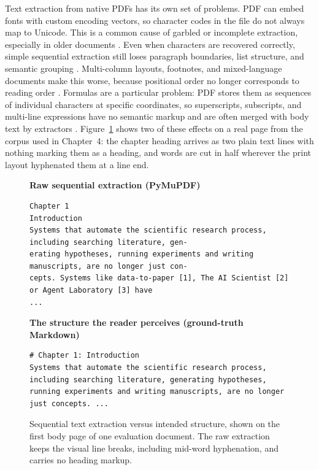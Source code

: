 Text extraction from native PDFs has its own set of problems. PDF can embed
fonts with custom encoding vectors, so character codes in the file do not
always map to Unicode. This is a common cause of garbled or incomplete
extraction, especially in older documents \autocite{whitington2012}. Even when
characters are recovered correctly, simple sequential extraction still loses
paragraph boundaries, list structure, and semantic grouping
\autocite{meuschke2023}. Multi-column layouts, footnotes, and mixed-language
documents make this worse, because positional order no longer corresponds to
reading order \autocite{gao2011}. Formulas are a particular problem: PDF stores
them as sequences of individual characters at specific coordinates, so
superscripts, subscripts, and multi-line expressions have no semantic markup
and are often merged with body text by extractors \autocite{blecher2023}.
Figure~\ref{fig:extraction_example} shows two of these effects on a real
page from the corpus used in Chapter~4: the chapter heading arrives as two
plain text lines with nothing marking them as a heading, and words are cut
in half wherever the print layout hyphenated them at a line end.

\begin{figure}[ht]
\medskip\noindent\textbf{Raw sequential extraction (PyMuPDF)}
\begin{lstlisting}[language={},nolol,identifierstyle=\color{black},basicstyle=\footnotesize\ttfamily\color{black}]
Chapter 1
Introduction
Systems that automate the scientific research process, including searching literature, gen-
erating hypotheses, running experiments and writing manuscripts, are no longer just con-
cepts. Systems like data-to-paper [1], The AI Scientist [2] or Agent Laboratory [3] have
...
\end{lstlisting}

\medskip\noindent\textbf{The structure the reader perceives (ground-truth Markdown)}
\begin{lstlisting}[language={},nolol,identifierstyle=\color{black},basicstyle=\footnotesize\ttfamily\color{black}]
# Chapter 1: Introduction
Systems that automate the scientific research process, including searching literature, generating hypotheses, running experiments and writing manuscripts, are no longer just concepts. ...
\end{lstlisting}
\caption{Sequential text extraction versus intended structure, shown on the
first body page of one evaluation document. The raw extraction keeps the
visual line breaks, including mid-word hyphenation, and carries no heading
markup.}
\label{fig:extraction_example}
\end{figure}

